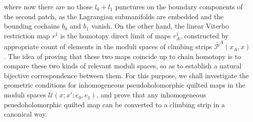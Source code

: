 \documentclass{amsart}
\numberwithin{equation}{section}
\numberwithin{figure}{section}
\begin{document}
where now there are no those $l_{0} + l_{1}$ punctures on the boundary components of the second patch, as the Lagrangian submanifolds are embedded and the bounding cochains $b_{0}$ and $b_{1}$ vanish. On the other hand, the linear Viterbo restriction map $r^{1}$ is the homotopy direct limit of maps $r^{1}_{A}$, constructed by appropriate count of elements in the moduli spaces of climbing strips $\bar{\mathcal{P}}^{A}(x_{A}, x)$.
The idea of proving that these two maps coincide up to chain homotopy is to compare these two kinds of relevant moduli spaces, so as to establish a natural bijective correspondence between them. For this purpose, we shall investigate the geometric conditions for inhomogeneous pseudoholomorphic quilted maps in the moduli spaces $\bar{\mathcal{U}}(x; x'; e_{0}, e_{1})$, and prove that any inhomogeneous psuedoholomorphic quilted map can be converted to a climbing strip in a canonical way. \par
\end{document}
